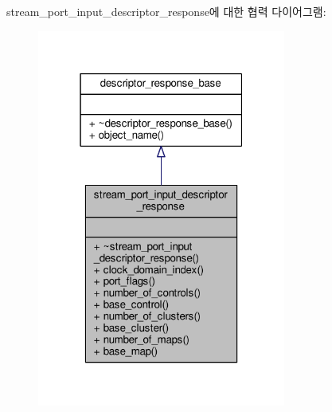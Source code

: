 stream\+\_\+port\+\_\+input\+\_\+descriptor\+\_\+response에 대한 협력 다이어그램\+:
\nopagebreak
\begin{figure}[H]
\begin{center}
\leavevmode
\includegraphics[width=232pt]{classavdecc__lib_1_1stream__port__input__descriptor__response__coll__graph}
\end{center}
\end{figure}

